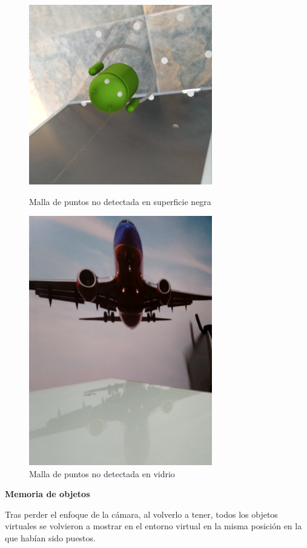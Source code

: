 \begin{figure}[!htbp]
	\begin{minipage}{0.48\textwidth}
		\centering
		\includegraphics[width=8cm]{desarrollo/secciones/pruebas/motog6/img/SUPERFICIENEGRA.png}
		\caption{Malla de puntos no detectada en superficie negra}
		\label{fig:motog6supnegra}
	\end{minipage}\hfill
	\begin{minipage}{0.48\textwidth}
		\centering
		\includegraphics[width=8cm]{desarrollo/secciones/pruebas/motog6/img/VIDRIO.png}
		\caption{Malla de puntos no detectada en vidrio}
		\label{fig:motog6vidrio}
	\end{minipage}\hfill
\end{figure}


\textbf{Memoria de objetos} \par
Tras perder el enfoque de la cámara, al volverlo a tener, todos los objetos virtuales se volvieron a mostrar en el entorno virtual en la misma posición en la que habían sido puestos.

